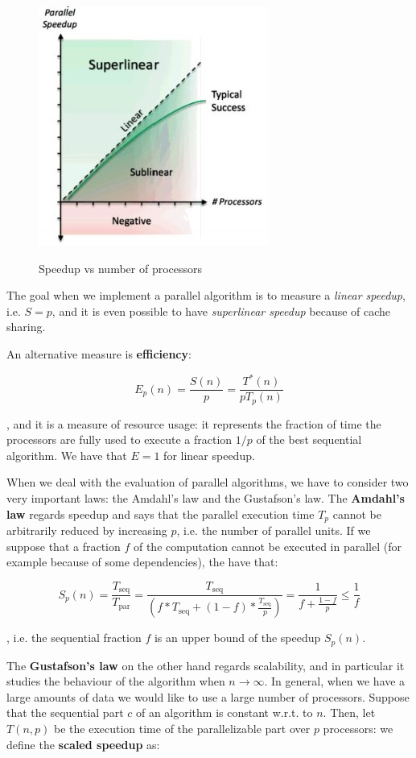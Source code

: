 \begin{figure}[h!]
		\centering
		\includegraphics[scale = 1.5]{img/speedup.jpg}
        \label{speedup}
        \caption{Speedup vs number of processors}
\end{figure}

The goal when we implement a parallel algorithm is to measure a \textit{linear speedup}, i.e. $S = p$, and it is even possible to have \textit{superlinear speedup} because of cache sharing.

An alternative measure is \textbf{efficiency}:

$$
E_p(n) = \frac{S(n)}{p} = \frac{T^*(n)}{p T_p(n)}
$$

, and it is a measure of resource usage: it represents the fraction of time the processors are fully used to execute a fraction $1/p$ of the best sequential algorithm. We have that $E = 1$ for linear speedup.

When we deal with the evaluation of parallel algorithms, we have to consider two very important laws: the Amdahl's law and the Gustafson's law. The \textbf{Amdahl's law} regards speedup and says that the parallel execution time $T_p$ cannot be arbitrarily reduced by increasing $p$, i.e. the number of parallel units. If we suppose that a fraction $f$ of the computation cannot be executed in parallel (for example because of some dependencies), the have that:

$$
S_p(n) = \frac{T_{\text{seq}}}{T_{\text{par}}} = \frac{T_{\text{seq}}}{(f * T_{\text{seq}} + (1-f) * \frac{T_{\text{seq}}}{p})} = \frac{1}{f + \frac{1-f}{p}} \leq \frac{1}{f}
$$

, i.e. the sequential fraction $f$ is an upper bound of the speedup $S_p(n)$.

The \textbf{Gustafson's law} on the other hand regards scalability, and in particular it studies the behaviour of the algorithm when $n \to \infty$. In general, when we have a large amounts of data we would like to use a large number of processors. Suppose that the sequential part $c$ of an algorithm is constant w.r.t. to $n$. Then, let $T(n,p)$ be the execution time of the parallelizable part over $p$ processors: we define the \textbf{scaled speedup} as:

